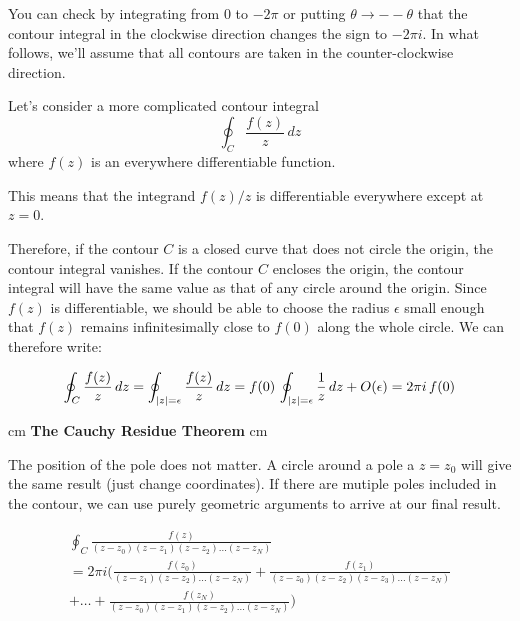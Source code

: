 \documentclass[12pt]{article}
\begin{document}
You can check by integrating from $0$ to $-2\pi$ or putting $\theta \to -
-\theta$ that the contour integral in the clockwise direction changes the sign
to $-2 \pi i$.  In what follows, we'll assume that all contours are taken in the
counter-clockwise direction.

Let's consider a more complicated contour integral
\begin{displaymath}
\oint_C \frac{f(z)}{z}\,dz 
\end{displaymath}
where $f(z)$ is an everywhere differentiable function.


This means that the integrand $f(z)/z$ is differentiable everywhere except at $z=0$.

Therefore, if the contour $C$ is a closed curve that does not circle the origin,
the contour integral vanishes.  If the contour $C$ encloses the origin, the
contour integral will have the same value as that of any circle around the
origin.  Since $f(z)$ is differentiable, we should be able to choose the radius
$\epsilon$ small enough that $f(z)$ remains infinitesimally close to $f(0)$
along the whole circle.  We can therefore write:

\begin{displaymath}
\oint_C \frac{f(z)}{z}\,dz = 
\oint_{\left| z \right|=\epsilon} \frac{f(z)}{z}\,dz =
f(0) \, \oint_{\left| z \right|=\epsilon} \frac{1}{z}\,dz + O(\epsilon)
= 2 \pi i \, f(0)
\end{displaymath}

 cm
\noindent
{\bf The Cauchy Residue Theorem}
 cm
\noindent

The position of the pole does not matter.  A circle around a pole a $z=z_0$ will give the same result (just change coordinates).  If there are mutiple poles included in the contour, we can use purely geometric arguments to arrive at our final result.

\begin{equation}
\begin{split}
\oint_C \frac{f(z)}{(z-z_0)(z-z_1)(z-z_2)\dots(z-z_N)} \\
= 2 \pi i (
\frac{f(z_0)}{(z-z_1)(z-z_2)\dots(z-z_N)} 
+\frac{f(z_1)}{(z-z_0)(z-z_2)(z-z_3)\dots(z-z_N)} \\
+ \dots
+\frac{f(z_N)}{(z-z_0)(z-z_1)(z-z_2)\dots(z-z_N)}
)
\end{split}
\end{equation}
\end{document}
